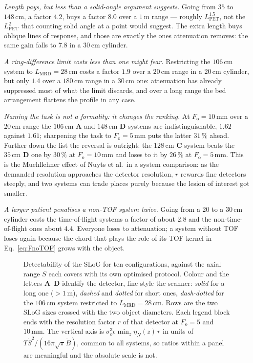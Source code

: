 \documentclass[11pt,a4paper]{article}
\newcommand{\Lpet}{L_{\mathrm{PET}}}
\newcommand{\Lmrd}{L_{\mathrm{MRD}}}
\newcommand{\Fo}{F_{\mathrm{o}}}
\newcommand{\so}{\sigma_{\!o}}
\begin{document}
\emph{Length pays, but less than a solid-angle argument suggests.} Going from $35$ to
$148\,\mathrm{cm}$, a factor $4.2$, buys a factor $8.0$ over a $1\,\mathrm{m}$ range ---
roughly $\Lpet^{1.5}$, not the $\Lpet^{2}$ that counting solid angle at a point would
suggest. The extra length buys oblique lines of response, and those are exactly the ones
attenuation removes: the same gain falls to $7.8$ in a $30\,\mathrm{cm}$ cylinder.

\emph{A ring-difference limit costs less than one might fear.} Restricting the
$106\,\mathrm{cm}$ system to $\Lmrd=28\,\mathrm{cm}$ costs a factor $1.9$ over a
$20\,\mathrm{cm}$ range in a $20\,\mathrm{cm}$ cylinder, but only $1.4$ over a
$180\,\mathrm{cm}$ range in a $30\,\mathrm{cm}$ one: attenuation has already suppressed most
of what the limit discards, and over a long range the bed arrangement flattens the profile
in any case.

\emph{Naming the task is not a formality: it changes the ranking.} At $\Fo=10\,\mathrm{mm}$
over a $20\,\mathrm{cm}$ range the $106\,\mathrm{cm}$ \textbf{A} and $148\,\mathrm{cm}$
\textbf{D} systems are indistinguishable, $1.62$ against $1.61$; sharpening the task to
$\Fo=5\,\mathrm{mm}$ puts the latter $31\,\%$ ahead. Further down the list the reversal is
outright: the $128\,\mathrm{cm}$ \textbf{C} system beats the $35\,\mathrm{cm}$ \textbf{D}
one by $30\,\%$ at $\Fo=10\,\mathrm{mm}$ and loses to it by $26\,\%$ at
$\Fo=5\,\mathrm{mm}$. This is the Muehllehner effect of Nuyts et al.\ in a system
comparison: as the demanded resolution approaches the detector resolution, $r$ rewards fine
detectors steeply, and two systems can trade places purely because the lesion of interest
got smaller.

\emph{A larger patient penalises a non-TOF system twice.} Going from a $20$ to a
$30\,\mathrm{cm}$ cylinder costs the time-of-flight systems a factor of about $2.8$ and the
non-time-of-flight ones about $4.4$. Everyone loses to attenuation; a system without TOF
loses again because the chord that plays the role of its TOF kernel in
Eq.~\eqref{eq:FnoTOF} grows with the object.

\begin{figure}[tbp]
\centering

\caption{Detectability of the SLoG for ten configurations, against the axial range $S$
each covers with its own optimised protocol. Colour and the letters \textbf{A}--\textbf{D}
identify the detector, line style the scanner: \emph{solid} for a long one
($>1\,\mathrm{m}$), \emph{dashed} and \emph{dotted} for short ones, \emph{dash-dotted} for
the $106\,\mathrm{cm}$ system restricted to $\Lmrd=28\,\mathrm{cm}$. Rows are the two SLoG
sizes crossed with the two object diameters. Each legend block ends with the resolution
factor $r$ of that detector at $\Fo=5$ and $10\,\mathrm{mm}$. The vertical axis is
$\so^{3}\epsilon\min_z\eta_N(z)\,r$ in units of $T\dot S^{2}/(16\pi\sqrt{\pi}\dot B)$, common
to all systems, so ratios within a panel are meaningful and the absolute scale is not.}
\label{fig:scen}
\end{figure}
\end{document}

